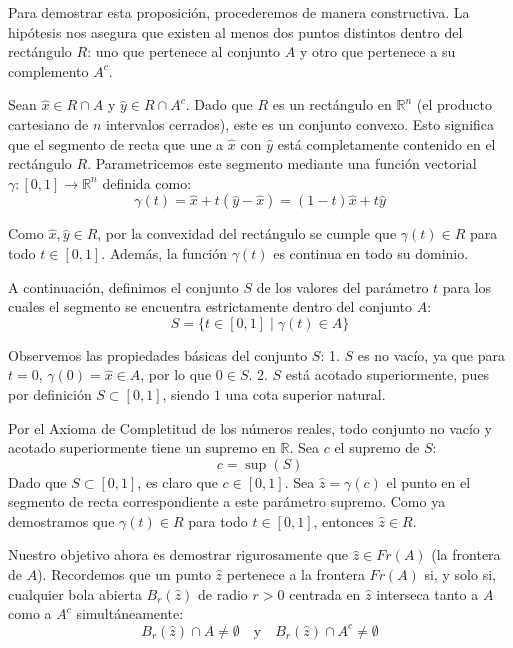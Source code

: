\documentclass[11pt,letterpaper]{article}
\begin{document}
Para demostrar esta proposición, procederemos de manera constructiva. La hipótesis nos asegura que existen al menos dos puntos distintos dentro del rectángulo $R$: uno que pertenece al conjunto $A$ y otro que pertenece a su complemento $A^{c}$.

Sean $\hat{x} \in R \cap A$ y $\hat{y} \in R \cap A^{c}$. Dado que $R$ es un rectángulo en $\mathbb{R}^{n}$ (el producto cartesiano de $n$ intervalos cerrados), este es un conjunto convexo. Esto significa que el segmento de recta que une a $\hat{x}$ con $\hat{y}$ está completamente contenido en el rectángulo $R$. Parametricemos este segmento mediante una función vectorial $\gamma: [0,1] \rightarrow \mathbb{R}^{n}$ definida como:
\begin{equation*}
\gamma(t) = \hat{x} + t(\hat{y} - \hat{x}) = (1-t)\hat{x} + t\hat{y}
\end{equation*}

Como $\hat{x}, \hat{y} \in R$, por la convexidad del rectángulo se cumple que $\gamma(t) \in R$ para todo $t \in [0,1]$. Además, la función $\gamma(t)$ es continua en todo su dominio.

A continuación, definimos el conjunto $S$ de los valores del parámetro $t$ para los cuales el segmento se encuentra estrictamente dentro del conjunto $A$:
\begin{equation*}
S = \{t \in [0,1] \mid \gamma(t) \in A\}
\end{equation*}

Observemos las propiedades básicas del conjunto $S$:
1. $S$ es no vacío, ya que para $t=0$, $\gamma(0) = \hat{x} \in A$, por lo que $0 \in S$.
2. $S$ está acotado superiormente, pues por definición $S \subset [0,1]$, siendo $1$ una cota superior natural.

Por el Axioma de Completitud de los números reales, todo conjunto no vacío y acotado superiormente tiene un supremo en $\mathbb{R}$. Sea $c$ el supremo de $S$:
\begin{equation*}
c = \sup(S)
\end{equation*}
Dado que $S \subset [0,1]$, es claro que $c \in [0,1]$. Sea $\hat{z} = \gamma(c)$ el punto en el segmento de recta correspondiente a este parámetro supremo. Como ya demostramos que $\gamma(t) \in R$ para todo $t \in [0,1]$, entonces $\hat{z} \in R$.

Nuestro objetivo ahora es demostrar rigurosamente que $\hat{z} \in Fr(A)$ (la frontera de $A$). Recordemos que un punto $\hat{z}$ pertenece a la frontera $Fr(A)$ si, y solo si, cualquier bola abierta $B_{r}(\hat{z})$ de radio $r>0$ centrada en $\hat{z}$ interseca tanto a $A$ como a $A^{c}$ simultáneamente:
\begin{equation*}
B_{r}(\hat{z}) \cap A \ne \emptyset \quad \text{y} \quad B_{r}(\hat{z}) \cap A^{c} \ne \emptyset
\end{equation*}
\end{document}
